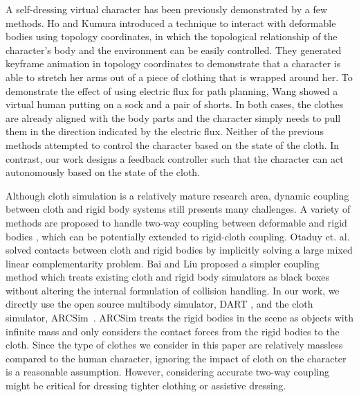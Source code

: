 A self-dressing virtual character has been previously demonstrated by a
few methods. Ho and Kumura  introduced a technique
to interact with deformable bodies using topology coordinates, in which
the topological relationship of the character's body and the environment
can be easily controlled. They generated keyframe animation in topology
coordinates to demonstrate that a character is able to stretch her arms
out of a piece of clothing that is wrapped around her. To demonstrate the
effect of using electric flux for path planning, Wang \etal
{} showed a virtual human putting on a sock and a
pair of shorts. In both cases, the clothes are already aligned with the
body parts and the character simply needs to pull them in the direction
indicated by the electric flux. Neither of the previous methods attempted
to control the character based on the state of the cloth. In contrast, our
work designs a feedback controller such that the character can act
autonomously based on the state of the cloth.


Although cloth simulation is a relatively mature research area, dynamic
coupling between cloth and rigid body systems still presents many
challenges. A variety of methods are proposed to handle two-way coupling
between deformable and rigid bodies
\cite{Jansson:2003:CDR,Sifakis:2007:HSD,Shinar:2008:TCR,Otaduy:2009:ICH,Miguel:2011:ESC},
which can be potentially extended to rigid-cloth coupling. Otaduy et. al.
\cite{Otaduy:2009:ICH} solved contacts between cloth and rigid bodies by
implicitly solving a large mixed linear complementarity problem. Bai and
Liu \cite{Bai:2014:CCR} proposed a simpler coupling method which treats
existing cloth and rigid body simulators as black boxes without altering
the internal formulation of collision handling. In our work, we directly
use the open source multibody simulator, DART \cite{Liu:2012:STM}, and the
cloth simulator, ARCSim~\cite{Narain:2012:AAR,Narain:2013:FCA}. ARCSim
treats the rigid bodies in the scene as objects with infinite mass and
only considers the contact forces from the rigid bodies to the cloth.
Since the type of clothes we consider in this paper are relatively
massless compared to the human character, ignoring the impact of cloth on
the character is a reasonable assumption. However, considering accurate
two-way coupling might be critical for dressing tighter clothing or
assistive dressing.

